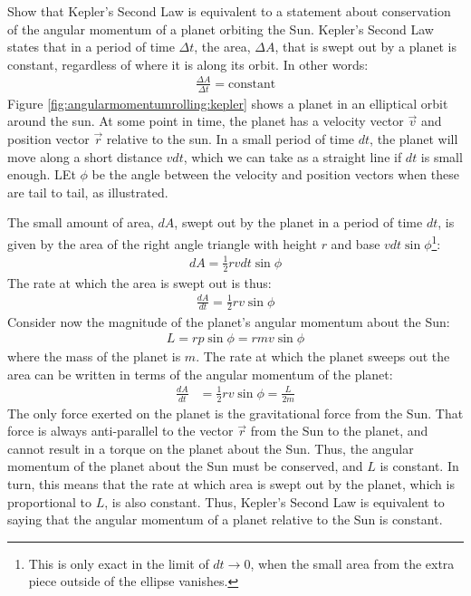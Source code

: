 \begin{example}{Show that Kepler's Second Law is equivalent to a statement about conservation of the angular momentum of a planet orbiting the Sun.}
Kepler's Second Law states that in a period of time $\Delta t$, the area, $\Delta A$, that is swept out by a planet is constant, regardless of where it is along its orbit. In other words:
\begin{align*}
\frac{\Delta A}{\Delta t} = \text{constant}
\end{align*}
 Figure \ref{fig:angularmomentumrolling:kepler} shows a planet in an elliptical orbit around the sun. 
At some point in time, the planet has a velocity vector $\vec v$ and position vector $\vec r$ relative to the sun. In a small period of time $dt$, the planet will move along a short distance $vdt$, which we can take as a straight line if $dt$ is small enough. LEt $\phi$ be the angle between the velocity and position vectors when these are tail to tail, as illustrated. 

The small amount of area, $dA$, swept out by the planet in a period of time $dt$, is given by the area of the right angle triangle with height $r$ and base $vdt\sin\phi$\footnote{This is only exact in the limit of $dt\to 0$, when the small area from the extra piece outside of the ellipse vanishes.}:
\begin{align*}
dA = \frac{1}{2} r vdt\sin\phi
\end{align*}
The rate at which the area is swept out is thus:
\begin{align*}
\frac{dA}{dt} =  \frac{1}{2} r v\sin\phi
\end{align*}
Consider now the magnitude of the planet's angular momentum about the Sun:
\begin{align*}
L = rp\sin\phi = rmv\sin\phi
\end{align*}
where the mass of the planet is $m$. The rate at which the planet sweeps out the area can be written in terms of the angular momentum of the planet:
\begin{align*}
\frac{dA}{dt} &=  \frac{1}{2} r v\sin\phi = \frac{L}{2m}
\end{align*}
The only force exerted on the planet is the gravitational force from the Sun. That force is always anti-parallel to the vector $\vec r$ from the Sun to the planet, and cannot result in a torque on the planet about the Sun. Thus, the angular momentum of the planet about the Sun must be conserved, and $L$ is constant. In turn, this means that the rate at which area is swept out by the planet, which is proportional to $L$, is also constant. Thus, Kepler's Second Law is equivalent to saying that the angular momentum of a planet relative to the Sun is constant. 
\end{example}




